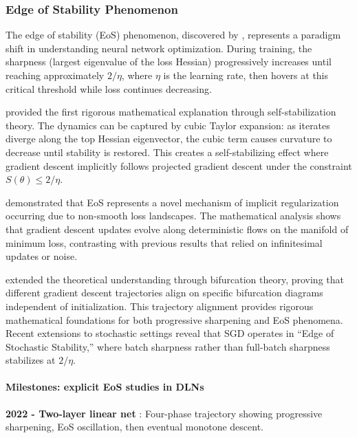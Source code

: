 \documentclass[11pt]{article}
\begin{document}
\subsubsection{Edge of Stability Phenomenon}

The edge of stability (EoS) phenomenon, discovered by \citet{cohen2021gradient}, represents a paradigm shift in understanding neural network optimization. During training, the sharpness (largest eigenvalue of the loss Hessian) progressively increases until reaching approximately $2/\eta$, where $\eta$ is the learning rate, then hovers at this critical threshold while loss continues decreasing.

\citet{damian2022self} provided the first rigorous mathematical explanation through self-stabilization theory. The dynamics can be captured by cubic Taylor expansion: as iterates diverge along the top Hessian eigenvector, the cubic term causes curvature to decrease until stability is restored. This creates a self-stabilizing effect where gradient descent implicitly follows projected gradient descent under the constraint $S(\theta) \leq 2/\eta$.

\citet{Arora2022Understanding} demonstrated that EoS represents a novel mechanism of implicit regularization occurring due to non-smooth loss landscapes. The mathematical analysis shows that gradient descent updates evolve along deterministic flows on the manifold of minimum loss, contrasting with previous results that relied on infinitesimal updates or noise.

\citet{song2023trajectory} extended the theoretical understanding through bifurcation theory, proving that different gradient descent trajectories align on specific bifurcation diagrams independent of initialization. This trajectory alignment provides rigorous mathematical foundations for both progressive sharpening and EoS phenomena. Recent extensions to stochastic settings reveal that SGD operates in ``Edge of Stochastic Stability,'' where batch sharpness rather than full-batch sharpness stabilizes at $2/\eta$.

\paragraph{Milestones: explicit EoS studies in DLNs}

\textbf{2022 - Two-layer linear net} \citep{Li2022SharpnessEoS}: Four-phase trajectory showing progressive sharpening, EoS oscillation, then eventual monotone descent.
\end{document}
